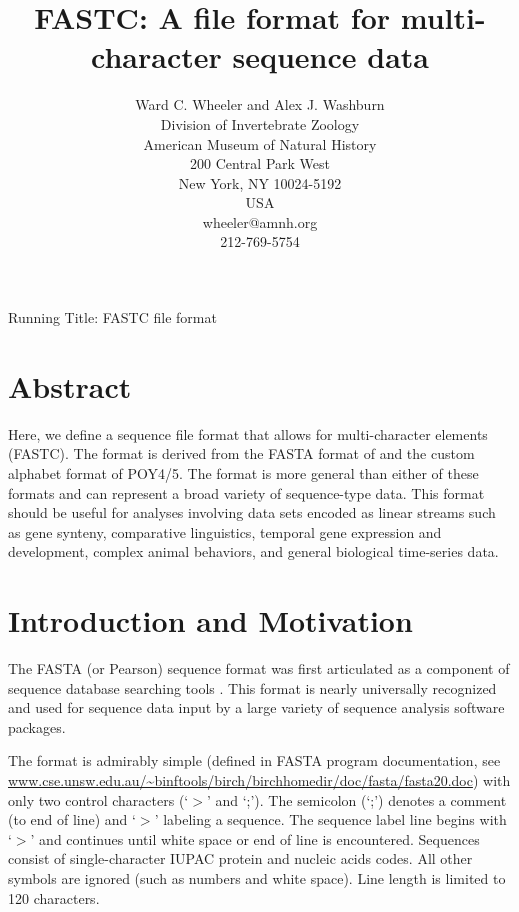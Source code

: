 \documentclass[12pt]{article}
\begin{document}
\title{FASTC: A file format for multi-character sequence data}
\author{Ward C. Wheeler and Alex J. Washburn \\
		Division of  Invertebrate Zoology\\
		American Museum of Natural History\\
		200 Central Park West\\
		New York, NY 10024-5192\\
		USA\\
		wheeler@amnh.org\\
		212-769-5754}

\maketitle
\begin{center}
Running Title: FASTC file format
\end{center}
\newpage
\doublespacing

\section{Abstract}
Here, we define a sequence file format that allows for multi-character elements (FASTC).  The format is derived from the FASTA format of and the custom alphabet format of POY4/5.  The format is more general than either of these formats and can represent a broad variety of sequence-type data.  This format should be useful for analyses involving data sets encoded as linear streams such as gene synteny, comparative linguistics, temporal gene expression and development, 
complex animal behaviors, and general biological time-series data. 

\newpage
\tableofcontents
\newpage

\section{Introduction and Motivation}
The FASTA (or Pearson) sequence format was first articulated as a component of sequence database searching tools
\citep{LipmanandPearson1985}.  This format is nearly universally recognized and used for sequence data input 
by a large variety of sequence analysis software packages.

The format is admirably simple (defined in FASTA program documentation, see \url{www.cse.unsw.edu.au/~binftools/birch/birchhomedir/doc/fasta/fasta20.doc}) with 
only two control characters (`$>$' and `;').  The semicolon (`;') denotes a comment (to end of line) and `$>$' labeling a sequence.  
The sequence label line begins with `$>$' and continues until white space or end of line is encountered.  Sequences consist of single-character
IUPAC protein and nucleic acids codes.  All other symbols are ignored (such as numbers and white space).  Line length is limited to 120 characters.
\end{document}
